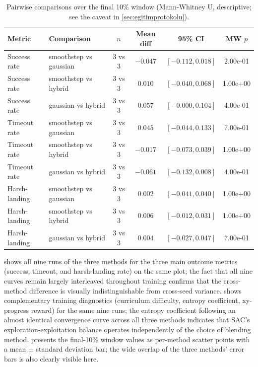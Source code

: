 \begin{table}[t]
\centering
\caption{Pairwise comparisons over the final 10\% window
(Mann-Whitney U, descriptive; see the caveat in
\cref{sec:egitimprotokolu}).}
\label{tab:pairwise}
\footnotesize
\begin{tabular}{@{}llcccc@{}}
\toprule
\textbf{Metric} & \textbf{Comparison} & \textbf{$n$} & \textbf{Mean diff} & \textbf{95\% CI} & \textbf{MW $p$} \\
\midrule
Success rate & smoothstep vs gaussian & 3 vs 3 & $-0.047$ & $[-0.112, 0.018]$ & 2.00e-01 \\
Success rate & smoothstep vs hybrid & 3 vs 3 & $0.010$ & $[-0.040, 0.068]$ & 1.00e+00 \\
Success rate & gaussian vs hybrid & 3 vs 3 & $0.057$ & $[-0.000, 0.104]$ & 4.00e-01 \\
Timeout rate & smoothstep vs gaussian & 3 vs 3 & $0.045$ & $[-0.044, 0.133]$ & 7.00e-01 \\
Timeout rate & smoothstep vs hybrid & 3 vs 3 & $-0.017$ & $[-0.073, 0.039]$ & 1.00e+00 \\
Timeout rate & gaussian vs hybrid & 3 vs 3 & $-0.061$ & $[-0.132, 0.008]$ & 4.00e-01 \\
Harsh-landing & smoothstep vs gaussian & 3 vs 3 & $0.002$ & $[-0.041, 0.040]$ & 1.00e+00 \\
Harsh-landing & smoothstep vs hybrid & 3 vs 3 & $0.006$ & $[-0.012, 0.031]$ & 1.00e+00 \\
Harsh-landing & gaussian vs hybrid & 3 vs 3 & $0.004$ & $[-0.027, 0.047]$ & 7.00e-01 \\
\bottomrule
\end{tabular}
\end{table}

 shows all nine runs of the three methods for
the three main outcome metrics (success, timeout, and harsh-landing
rate) on the same plot; the fact that all nine curves remain largely
interleaved throughout training confirms that the cross-method
difference is visually indistinguishable from cross-seed variance.
 shows complementary training diagnostics
(curriculum difficulty, entropy coefficient, xy-progress reward) for the
same nine runs; the entropy coefficient following an almost identical
convergence curve across all three methods indicates that SAC's
exploration-exploitation balance operates independently of the choice of
blending method.  presents the final-10\%
window values as per-method scatter points with a mean $\pm$ standard
deviation bar; the wide overlap of the three methods' error bars is also
clearly visible here.

